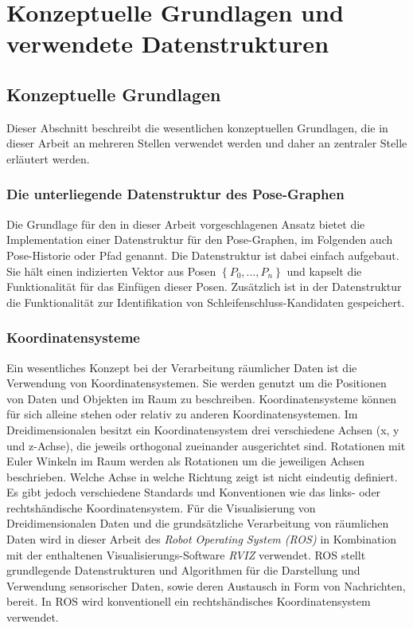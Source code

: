 \chapter{Konzeptuelle Grundlagen und verwendete Datenstrukturen}
\label{chapter:grundlagen}

\section{Konzeptuelle Grundlagen}

Dieser Abschnitt beschreibt die wesentlichen konzeptuellen Grundlagen, die in dieser Arbeit an mehreren Stellen verwendet werden und daher an zentraler Stelle erläutert werden.

\subsection{Die unterliegende Datenstruktur des Pose-Graphen}
\label{section:pose_graph}

Die Grundlage für den in dieser Arbeit vorgeschlagenen Ansatz bietet die Implementation einer Datenstruktur für den Pose-Graphen, im Folgenden auch Pose-Historie oder Pfad genannt. Die Datenstruktur ist dabei einfach aufgebaut. Sie hält einen indizierten Vektor aus Posen $\left\lbrace P_0, ..., P_n \right\rbrace$ und kapselt die Funktionalität für das Einfügen dieser Posen. Zusätzlich ist in der Datenstruktur die Funktionalität zur Identifikation von Schleifenschluss-Kandidaten gespeichert.

\subsection{Koordinatensysteme}

Ein wesentliches Konzept bei der Verarbeitung räumlicher Daten ist die Verwendung von Koordinatensystemen. Sie werden genutzt um die Positionen von Daten und Objekten im Raum zu beschreiben. Koordinatensysteme können für sich alleine stehen oder relativ zu anderen Koordinatensystemen.
Im Dreidimensionalen besitzt ein Koordinatensystem drei verschiedene Achsen (x, y und z-Achse), die jeweils orthogonal zueinander ausgerichtet sind.
Rotationen mit Euler Winkeln im Raum werden als Rotationen um die jeweiligen Achsen beschrieben.
Welche Achse in welche Richtung zeigt ist nicht eindeutig definiert.
Es gibt jedoch verschiedene Standards und Konventionen wie das links- oder rechtshändische Koordinatensystem. Für die Visualisierung von Dreidimensionalen Daten und die grundsätzliche Verarbeitung von räumlichen Daten wird in dieser Arbeit des \emph{Robot Operating System (ROS)} \cite{quigley2009ros} in Kombination mit der enthaltenen Visualisierungs-Software \emph{RVIZ} verwendet. ROS stellt grundlegende Datenstrukturen und Algorithmen für die Darstellung und Verwendung sensorischer Daten, sowie deren Austausch in Form von Nachrichten, bereit. In ROS wird konventionell ein rechtshändisches Koordinatensystem verwendet.

